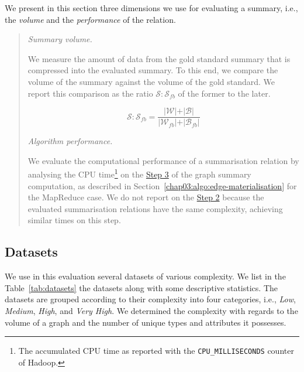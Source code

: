 We present in this section three dimensions we use for evaluating a summary, i.e., the \emph{volume} and the \emph{performance} of the relation.

\begin{quotation}
	\item[\emph{Summary volume.}]
	
	We measure the amount of data from the gold standard summary that is compressed into the evaluated summary. To this end, we compare the volume of the summary against the volume of the gold standard. We report this comparison as the ratio  $\mathcal{S}:\mathcal{S}_{fb}$ of the former to the later.
	
	$$
	\mathcal{S}:\mathcal{S}_{fb} = \frac{\vert \mathcal{W} \vert + \vert \mathcal{B} \vert}{\vert \mathcal{W}_{fb} \vert + \vert \mathcal{B}_{fb} \vert}
	$$
	
	\item[\emph{Algorithm performance.}]
	
	We evaluate the computational performance of a summarisation relation by analysing the CPU time\footnote{The accumulated CPU time as reported with the \texttt{CPU\_MILLISECONDS} counter of Hadoop.} on the \hyperref[step-he]{Step 3} of the graph summary computation, as described in Section~\ref{chap03:algo:edge-materialisation} for the MapReduce case. We do not report on the \hyperref[step-hn]{Step 2} because the evaluated summarisation relations have the same complexity, achieving similar times on this step.
\end{quotation}

\subsection{Datasets}
\label{sec:eval:datasets}

We use in this evaluation several datasets of various complexity. We list in the Table~\ref{tab:datasets} the datasets along with some descriptive statistics. The datasets are grouped according to their complexity into four categories, i.e., \emph{Low}, \emph{Medium}, \emph{High}, and \emph{Very High}. We determined the complexity with regards to the volume of a graph and the number of unique types and attributes it possesses.

